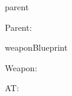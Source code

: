 \documentclass[12pt]{pnpprep}
\begin{document}
\begin{blueprint}{parent}


    \begin{render}
        \begin{panel}{\namevalue}
            Parent: \namevalue
            \par

            \renderChildren
        \end{panel}
    \end{render}
\end{blueprint}


\begin{blueprint}{weaponBlueprint}

    \begin{render}
        Weapon: \namevalue
        \par
        AT: \ATvalue
        \par
    \end{render}
\end{blueprint}


\begin{parent}

    \begin{weapon}
    \end{weapon}
\end{parent}


\begin{parent}

    \begin{weapon}
    \end{weapon}
\end{parent}
\end{document}
